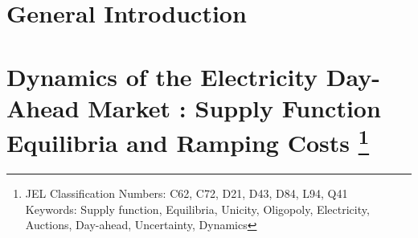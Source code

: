 \documentclass[book,12pt,twoside,openright,authoryear]{report}
\begin{document}







\renewcommand{\cftchappresnum}{Chapter\space}
\renewcommand{\cftchapaftersnum}{:}
\renewcommand{\cftchapnumwidth}{6em}

\onehalfspace
{}
\cleardoublepage


\renewcommand{\thesection}{\arabic{chapter}.\arabic{section}}
\chapter*{General Introduction}
\label{chap:intro}
\pagestyle{empty} 
\cleardoublepage
\pagestyle{fancy} 
\fancyhead{} 
\lhead[Introduction]{}
\fancyfoot{}


\renewcommand{\thesection}{\arabic{chapter}.\arabic{section}}
\chapter[Dynamics of the Electricity Day-Ahead Market : Supply Function Equilibria and Ramping Costs]{Dynamics of the Electricity Day-Ahead Market : Supply Function Equilibria and Ramping Costs \footnote{JEL Classification Numbers:  C62, C72, D21, D43, D84, L94, Q41 \\
Keywords: Supply function, Equilibria, Unicity, Oligopoly, Electricity, Auctions, Day-ahead, Uncertainty, Dynamics}}
\label{chap:ch1}
\pagestyle{empty} 
\cleardoublepage
\pagestyle{fancy} 
\fancyhead{} 

\fancyfoot{}

\end{document}
